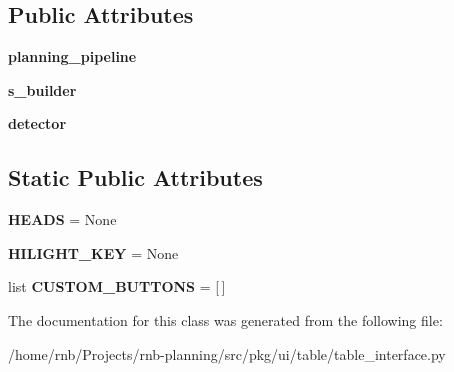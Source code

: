 \subsection*{Public Attributes}
\begin{DoxyCompactItemize}
\item 
\mbox{\label{classrnb-planning_1_1src_1_1pkg_1_1ui_1_1table_1_1table__interface_1_1_table_interface_a34566bd3fd79281868b947aa5374019b}} 
{\bfseries planning\+\_\+pipeline}
\item 
\mbox{\label{classrnb-planning_1_1src_1_1pkg_1_1ui_1_1table_1_1table__interface_1_1_table_interface_a0b545eacaa04ca141018fa2621e7e734}} 
{\bfseries s\+\_\+builder}
\item 
\mbox{\label{classrnb-planning_1_1src_1_1pkg_1_1ui_1_1table_1_1table__interface_1_1_table_interface_a68829def413d45317b5cf278f2c740e2}} 
{\bfseries detector}
\end{DoxyCompactItemize}
\subsection*{Static Public Attributes}
\begin{DoxyCompactItemize}
\item 
\mbox{\label{classrnb-planning_1_1src_1_1pkg_1_1ui_1_1table_1_1table__interface_1_1_table_interface_a963f2f25f8681bfc63bd32838dcd3317}} 
{\bfseries H\+E\+A\+DS} = None
\item 
\mbox{\label{classrnb-planning_1_1src_1_1pkg_1_1ui_1_1table_1_1table__interface_1_1_table_interface_a23344ddb043b89e2852f374f70d01af3}} 
{\bfseries H\+I\+L\+I\+G\+H\+T\+\_\+\+K\+EY} = None
\item 
\mbox{\label{classrnb-planning_1_1src_1_1pkg_1_1ui_1_1table_1_1table__interface_1_1_table_interface_acd4818adcde7806adb30078edce93ccc}} 
list {\bfseries C\+U\+S\+T\+O\+M\+\_\+\+B\+U\+T\+T\+O\+NS} = \mbox{[}$\,$\mbox{]}
\end{DoxyCompactItemize}


The documentation for this class was generated from the following file\+:\begin{DoxyCompactItemize}
\item 
/home/rnb/\+Projects/rnb-\/planning/src/pkg/ui/table/table\+\_\+interface.\+py\end{DoxyCompactItemize}
